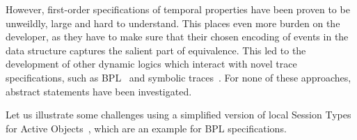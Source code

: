 However, first-order specifications of temporal properties have been proven to be unweildly, large and hard to understand. 
This places even more burden on the developer, as they have to make sure that their chosen encoding of events in the data structure captures the salient part of equivalence.
This led to the development of other dynamic logics which interact with novel trace specifications, such as BPL~\cite{DBLP:conf/tableaux/Kamburjan19} and symbolic traces~\cite{DBLP:conf/tableaux/BubelDHN15}. %
For none of these approaches, abstract statements have been investigated. %

Let us illustrate some challenges using a simplified version of local Session Types for Active Objects~\cite{DBLP:journals/jacm/HondaYC16,DBLP:journals/csur/BoerSHHRDJSKFY17,DBLP:conf/ifm/KamburjanC18}, which are an example for BPL specifications.

\begin{example}
\end{example}






